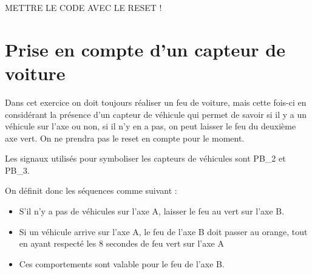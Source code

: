 \documentclass[11pt]{report}
\begin{document}
METTRE LE CODE AVEC LE RESET !

\section{Prise en compte d'un capteur de voiture}


Dans cet exercice on doit toujours réaliser un feu de voiture, mais cette fois-ci en considérant la présence d'un capteur de véhicule qui permet de savoir si il y a un véhicule sur l'axe ou non, si il n'y en a pas, on peut laisser le feu du deuxième axe vert. On ne prendra pas le reset en compte pour le moment.

Les signaux utilisés pour symboliser les capteurs de véhicules sont PB\_2 et PB\_3.

On définit donc les séquences comme suivant :
\begin{itemize}
	\item S'il n'y a pas de véhicules sur l'axe A, laisser le feu au vert sur l'axe B.
	\item Si un véhicule arrive sur l'axe A, le feu de l'axe B doit passer au orange, tout en ayant respecté les 8 secondes de feu vert sur l'axe A
	\item Ces comportements sont valable pour le feu de l'axe B. 

\end{itemize}
\end{document}
